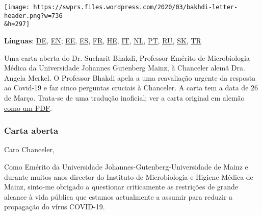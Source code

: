\texttt{[image: https://swprs.files.wordpress.com/2020/03/bakhdi-letter-header.png?w=736\\\&h=297]}

\textbf{Línguas}:
\href{https://swprs.org/offener-brief-von-professor-sucharit-bhakdi-an-bundeskanzlerin-dr-angela-merkel/}{DE},
\href{https://swprs.org/open-letter-from-professor-sucharit-bhakdi-to-german-chancellor-dr-angela-merkel/}{EN};
\href{https://swprs.org/professor-sucharit-bhakdi-avalik-kiri-angela-merkelile/}{EE},
\href{http://piensachile.com/2020/03/carta-abierta-a-angela-merkel/}{ES},
\href{https://swprs.org/covid-19-lettre-ouverte-du-professeur-sucharit-bhakdi-a-la-chanceliere-allemande-dre-angela-merkel/}{FR},
\href{https://yanivhamo.com/open-letter-from-professor-sucharit-bhakdi-to-german-chancellor-dr-angela-merkel-hebrew/}{HE},
\href{https://swprs.org/lettera-aperta-del-professor-sucharit-bhakdi-al-cancelliere-tedesco-dr-angela-merkel/}{IT},
\href{https://swprs.org/open-brief-van-professor-sucharit-bhakdi-aan-de-duitse-bondskanselier-dr-angela-merkel/}{NL},
\href{https://swprs.org/carta-aberta-do-professor-sucharit-bhakdi-a-chanceler-alema-dra-angela-merkel/}{PT},
\href{https://swprs.org/\%d0\%be\%d1\%82\%d0\%ba\%d1\%80\%d1\%8b\%d1\%82\%d0\%be\%d0\%b5-\%d0\%bf\%d0\%b8\%d1\%81\%d1\%8c\%d0\%bc\%d0\%be-\%d0\%bf\%d1\%80\%d0\%be\%d1\%84\%d0\%b5\%d1\%81\%d1\%81\%d0\%be\%d1\%80\%d0\%b0-\%d1\%81\%d1\%83\%d1\%87\%d0\%b0\%d1\%80\%d0\%b8\%d1\%82\%d0\%b0/}{RU},
\href{https://alatyr.sk/open-letter-from-professor_sk.htm}{SK},
\href{https://swprs.org/prof-dr-sucharit-bhakdiden-basbakan-dr-angela-merkele-acik-mektup/}{TR}

Uma carta aberta do Dr. Sucharit Bhakdi, Professor Emérito de
Microbiologia Médica da Universidade Johannes Gutenberg Mainz, à
Chanceler alemã Dra. Angela Merkel. O Professor Bhakdi apela a uma
reavaliação urgente da resposta ao Covid-19 e faz cinco perguntas
cruciais à Chanceler. A carta tem a data de 26 de Março. Trata-se de uma
tradução inoficial; ver a carta original em alemão
\href{https://swprs.org/offener-brief-von-professor-sucharit-bhakdi-an-bundeskanzlerin-dr-angela-merkel/}{como
um PDF}.

\hypertarget{carta-aberta}{%
\subsubsection{Carta aberta}\label{carta-aberta}}

Caro Chanceler,

Como Emérito da Universidade Johannes-Gutenberg-Universidade de Mainz e
durante muitos anos director do Instituto de Microbiologia e Higiene
Médica de Mainz, sinto-me obrigado a questionar criticamente as
restrições de grande alcance à vida pública que estamos actualmente a
assumir para reduzir a propagação do vírus COVID-19.

